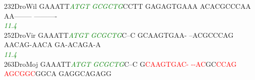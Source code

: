 \documentclass[11pt,twoside,reqno,a4paper]{article}
\begin{document}
{232\hspace*{1\charwidth}DroWil	GAAATT\textit{\textcolor{Green}{A}}\textit{\textcolor{Green}{T}}\textit{\textcolor{Green}{G}}\textit{\textcolor{Green}{T}}	\textit{\textcolor{Green}{G}}\textit{\textcolor{Green}{C}}\textit{\textcolor{Green}{G}}\textit{\textcolor{Green}{C}}\textit{\textcolor{Green}{T}}\textit{\textcolor{Green}{G}}CCTT	GAGAGTGAAA	ACACGCCCAA	AA--------	----------	\\
\hspace*{4\charwidth}\hspace*{7\charwidth}\hspace*{6\charwidth}\textit{\textcolor{Green}{11.4}}\hspace*{1\charwidth}\hspace*{1\charwidth}\hspace*{1\charwidth}\hspace*{1\charwidth}\hspace*{1\charwidth}\hspace*{1\charwidth}\\
252\hspace*{1\charwidth}DroVir	GAAATT\textit{\textcolor{Green}{A}}\textit{\textcolor{Green}{T}}\textit{\textcolor{Green}{G}}\textit{\textcolor{Green}{T}}	\textit{\textcolor{Green}{G}}\textit{\textcolor{Green}{C}}\textit{\textcolor{Green}{G}}\textit{\textcolor{Green}{C}}\textit{\textcolor{Green}{T}}\textit{\textcolor{Green}{G}}C--C	GCAAGTGAA-	--ACGCCCAG	AACAG-AACA	GA-ACAGA-A	\\
\hspace*{4\charwidth}\hspace*{7\charwidth}\hspace*{6\charwidth}\textit{\textcolor{Green}{11.4}}\hspace*{1\charwidth}\hspace*{1\charwidth}\hspace*{1\charwidth}\hspace*{1\charwidth}\hspace*{1\charwidth}\hspace*{1\charwidth}\\
263\hspace*{1\charwidth}DroMoj	GAAATT\textit{\textcolor{Green}{A}}\textit{\textcolor{Green}{T}}\textit{\textcolor{Green}{G}}\textit{\textcolor{Green}{T}}	\textit{\textcolor{Green}{G}}\textit{\textcolor{Green}{C}}\textit{\textcolor{Green}{G}}\textit{\textcolor{Green}{C}}\textit{\textcolor{Green}{T}}\textit{\textcolor{Green}{G}}C--C	G\textcolor{Red}{C}\textcolor{Red}{A}\textcolor{Red}{A}\textcolor{Red}{G}\textcolor{Red}{T}\textcolor{Red}{G}\textcolor{Red}{A}\textcolor{Red}{C}\textcolor{Red}{-}	\textcolor{Red}{-}\textcolor{Red}{-}\textcolor{Red}{A}\textcolor{Red}{C}GC\textcolor{Red}{C}\textcolor{Red}{C}\textcolor{Red}{A}\textcolor{Red}{G}	\textcolor{Red}{A}\textcolor{Red}{G}\textcolor{Red}{C}\textcolor{Red}{G}\textcolor{Red}{G}\textcolor{Red}{C}GGCA	GAGGCAGAGG	\\
}
\end{document}
